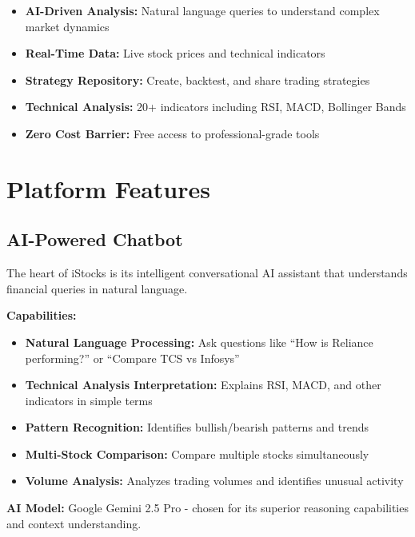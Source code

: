 \documentclass[11pt,a4paper]{article}
\begin{document}
\begin{featurebox}
\begin{itemize}[leftmargin=*]
    \item \textbf{AI-Driven Analysis:} Natural language queries to understand complex market dynamics
    \item \textbf{Real-Time Data:} Live stock prices and technical indicators
    \item \textbf{Strategy Repository:} Create, backtest, and share trading strategies
    \item \textbf{Technical Analysis:} 20+ indicators including RSI, MACD, Bollinger Bands
    \item \textbf{Zero Cost Barrier:} Free access to professional-grade tools
\end{itemize}
\end{featurebox}

\section{Platform Features}

\subsection{AI-Powered Chatbot}

The heart of iStocks is its intelligent conversational AI assistant that understands financial queries in natural language.

\textbf{Capabilities:}
\begin{itemize}[leftmargin=*]
    \item \textbf{Natural Language Processing:} Ask questions like ``How is Reliance performing?'' or ``Compare TCS vs Infosys''
    \item \textbf{Technical Analysis Interpretation:} Explains RSI, MACD, and other indicators in simple terms
    \item \textbf{Pattern Recognition:} Identifies bullish/bearish patterns and trends
    \item \textbf{Multi-Stock Comparison:} Compare multiple stocks simultaneously
    \item \textbf{Volume Analysis:} Analyzes trading volumes and identifies unusual activity
\end{itemize}

\textbf{AI Model:} Google Gemini 2.5 Pro - chosen for its superior reasoning capabilities and context understanding.
\end{document}
